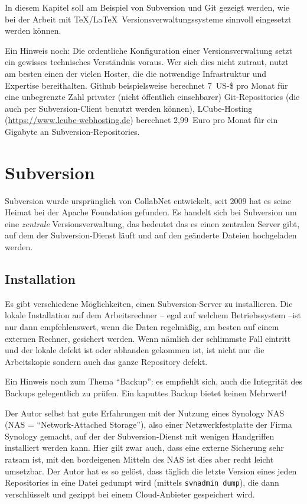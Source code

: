 In diesem Kapitel soll am Beispiel von Subversion und Git gezeigt werden, wie bei der Arbeit mit \TeX/\LaTeX\ Versionsverwaltungssysteme sinnvoll eingesetzt werden können.

Ein Hinweis noch: Die ordentliche Konfiguration einer Versionsverwaltung setzt ein gewisses technisches Verständnis voraus. Wer sich dies nicht zutraut, nutzt am besten einen der vielen Hoster, die die notwendige Infrastruktur und Expertise bereithalten. Github beispielsweise berechnet 7~US-\$ pro Monat für eine unbegrenzte Zahl privater (nicht öffentlich einsehbarer) Git-Repositories (die auch per Subversion-Client benutzt werden können), LCube-Hosting (\url{https://www.lcube-webhosting.de}) berechnet 2,99~Euro pro Monat für ein Gigabyte an Subversion-Repositories.

\section{Subversion}

Subversion wurde ursprünglich von CollabNet entwickelt, seit 2009 hat es seine Heimat bei der Apache Foundation gefunden. Es handelt sich bei Subversion um eine \textit{zentrale} Versionsverwaltung, das bedeutet das es einen zentralen Server gibt, auf dem der Subversion-Dienst läuft und auf den geänderte Dateien hochgeladen werden.

\subsection{Installation}

Es gibt verschiedene Möglichkeiten, einen Subversion-Server zu installieren. Die lokale Installation auf dem Arbeitsrechner -- egal auf welchem Betriebssystem --ist nur dann empfehlenswert, wenn die Daten regelmäßig, am besten auf einem externen Rechner, gesichert werden. Wenn nämlich der schlimmste Fall eintritt und der lokale defekt ist oder abhanden gekommen ist, ist nicht nur die Arbeitskopie sondern auch das ganze Repository defekt.

Ein Hinweis noch zum Thema \enquote{Backup}: es empfiehlt sich, auch die Integrität des Backups gelegentlich zu prüfen.
Ein kaputtes Backup bietet keinen Mehrwert!

Der Autor selbst hat gute Erfahrungen mit der Nutzung eines Synology NAS (NAS = \enquote{Network-Attached Storage}), also einer Netzwerkfestplatte der Firma Synology gemacht, auf der der Subversion-Dienst mit wenigen Handgriffen installiert werden kann. 
Hier gilt zwar auch, dass eine externe Sicherung sehr ratsam ist, mit den bordeigenen Mitteln des NAS ist dies aber recht leicht umsetzbar. 
Der Autor hat es so gelöst, dass täglich die letzte Version eines jeden Repositories in eine Datei gedumpt wird (mittels \texttt{svnadmin dump}), die dann verschlüsselt und gezippt bei einem Cloud-Anbieter gespeichert wird.

